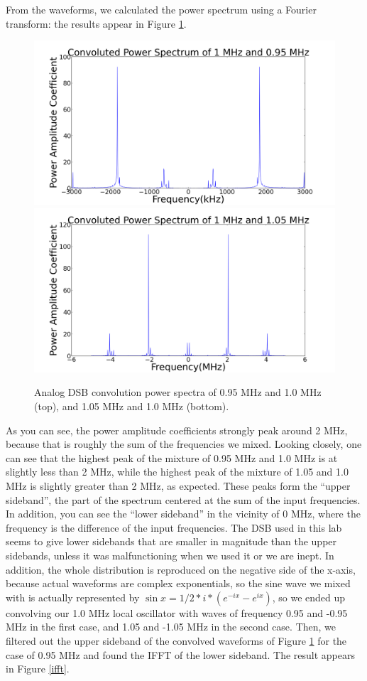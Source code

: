 \documentclass[11pt]{article}
\begin{document}
From the waveforms, we calculated the power spectrum using a Fourier transform: the results appear in Figure \ref{adsb}.

\begin{figure}
\centering
\includegraphics[scale=0.35]{pictures/opointninefive}
\includegraphics[scale=0.35]{pictures/onepointofive}
\caption{Analog DSB convolution power spectra of 0.95 MHz and 1.0 MHz (top), and 1.05 MHz and 1.0 MHz (bottom). \label{adsb}}
\end{figure}

 As you can see, the power amplitude coefficients strongly peak around 2 MHz, because that is roughly the sum of the frequencies we mixed. Looking closely, one can see that the highest peak of the mixture of 0.95 MHz and 1.0 MHz is at slightly less than 2 MHz, while the highest peak of the mixture of 1.05 and 1.0 MHz is slightly greater than 2 MHz, as expected. These peaks form the ``upper sideband'', the part of the spectrum centered at the sum of the input frequencies. In addition, you can see the ``lower sideband'' in the vicinity of 0 MHz, where the frequency is the difference of the input frequencies. The DSB used in this lab seems to give lower sidebands that are smaller in magnitude than the upper sidebands, unless it was malfunctioning when we used it or we are inept. In addition, the whole distribution is reproduced on the negative side of the x-axis, because actual waveforms are complex exponentials, so the sine wave we mixed with is actually represented by $\sin{x} = 1/2 * i * (e^{-ix} - e^{ix})$, so we ended up convolving our 1.0 MHz local oscillator with waves of frequency 0.95 and -0.95 MHz  in the first case, and 1.05 and -1.05 MHz in the second case. Then, we filtered out the upper sideband of the convolved waveforms of Figure \ref{adsb} for the case of 0.95 MHz and found the IFFT of the lower sideband. The result appears in Figure \ref{ifft}. 
\end{document}
